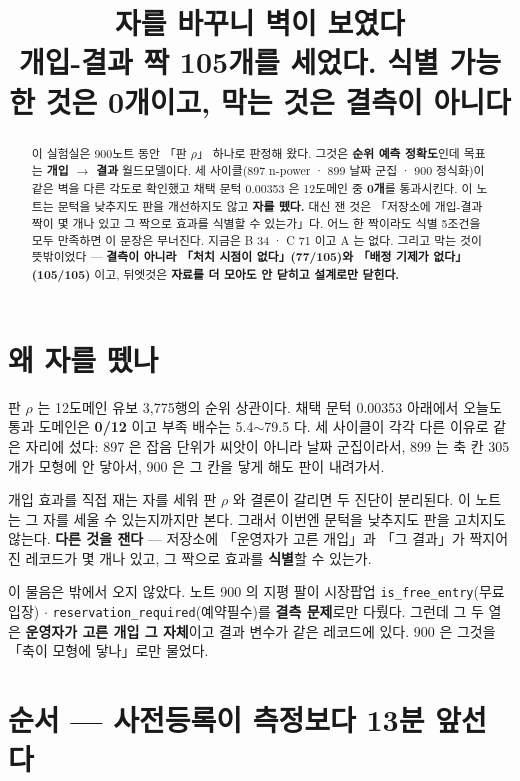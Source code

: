 \documentclass{article}
\title{자를 바꾸니 벽이 보였다 \\
  {\large 개입-결과 짝 105개를 세었다. 식별 가능한 것은 0개이고, 막는 것은 결측이 아니다}}
\begin{document}
\maketitle

\begin{abstract}
이 실험실은 900노트 동안 「판 $\rho$」 하나로 판정해 왔다. 그것은 \textbf{순위 예측 정확도}인데
목표는 \textbf{개입 $\to$ 결과} 월드모델이다. 세 사이클(897 n-power · 899 날짜 군집 · 900 정식화)이
같은 벽을 다른 각도로 확인했고 채택 문턱 0.00353 은 12도메인 중 \textbf{0개}를 통과시킨다.
이 노트는 문턱을 낮추지도 판을 개선하지도 않고 \textbf{자를 뗐다.}
대신 잰 것은 「저장소에 개입-결과 짝이 몇 개나 있고 그 짝으로 효과를 식별할 수 있는가」다.
{어느 한 짝이라도 식별 5조건을 모두 만족하면 이 문장은 무너진다.
지금은 B 34 · C 71 이고 A 는 없다.}
그리고 막는 것이 뜻밖이었다 --- \textbf{결측이 아니라 「처치 시점이 없다」(77/105)와
「배정 기제가 없다」(105/105)} 이고, 뒤엣것은 \textbf{자료를 더 모아도 안 닫히고 설계로만 닫힌다.}
\end{abstract}

\section{왜 자를 뗐나}

판 $\rho$ 는 12도메인 유보 3{,}775행의 순위 상관이다. 채택 문턱 0.00353 아래에서
오늘도 통과 도메인은 \textbf{0/12} 이고 부족 배수는 5.4$\sim$79.5 다. 세 사이클이 각각
다른 이유로 같은 자리에 섰다: 897 은 잡음 단위가 씨앗이 아니라 날짜 군집이라서,
899 는 축 칸 305개가 모형에 안 닿아서, 900 은 그 칸을 닿게 해도 판이 내려가서.

{개입 효과를 직접 재는 자를 세워 판 $\rho$ 와 결론이 갈리면 두 진단이 분리된다.
이 노트는 그 자를 세울 수 있는지까지만 본다.}
그래서 이번엔 문턱을 낮추지도 판을 고치지도 않는다. \textbf{다른 것을 잰다} ---
저장소에 「운영자가 고른 개입」과 「그 결과」가 짝지어진 레코드가 몇 개나 있고,
그 짝으로 효과를 \textbf{식별}할 수 있는가.

이 물음은 밖에서 오지 않았다. 노트 900 의 지평 팔이 시장팝업
\texttt{is\_free\_entry}(무료입장) $\cdot$ \texttt{reservation\_required}(예약필수)를
\textbf{결측 문제}로만 다뤘다. 그런데 그 두 열은 \textbf{운영자가 고른 개입 그 자체}이고
결과 변수가 같은 레코드에 있다. 900 은 그것을 「축이 모형에 닿나」로만 물었다.

\section{순서 --- 사전등록이 측정보다 13분 앞선다}
\end{document}
